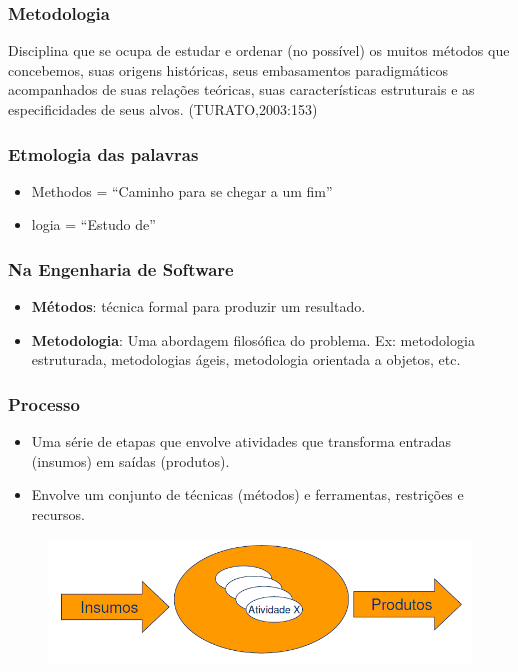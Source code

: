 \begin{frame}
 \frametitle{Metodologia}
 \begin{center}
  \begin{block}{}
   Disciplina que se ocupa de estudar e ordenar (no possível) os muitos métodos que
concebemos, suas origens históricas, seus embasamentos paradigmáticos
acompanhados de suas relações teóricas, suas características estruturais e as
especificidades de seus alvos. (TURATO,2003:153)
  \end{block}
 \end{center}
\end{frame}

\begin{frame}
 \frametitle{Etmologia das palavras}
 \begin{itemize}
  \item Methodos = “Caminho para se chegar a um fim”
  \item logia = “Estudo de”
 \end{itemize}
\end{frame}

\begin{frame}
 \frametitle{Na Engenharia de Software}
 \begin{itemize}
  \item \textbf{Métodos}: técnica formal para produzir um
resultado.
\item \textbf{Metodologia}: Uma abordagem filosófica do
problema. Ex: metodologia estruturada, metodologias ágeis, metodologia orientada a
objetos, etc.
 \end{itemize}
\end{frame}

\begin{frame}
 \frametitle{Processo}
 \begin{itemize}
  \item Uma série de etapas que envolve atividades que transforma entradas (insumos) em
saídas (produtos).
\item Envolve um conjunto de técnicas (métodos) e ferramentas, restrições e recursos.
 \end{itemize}
\begin{figure}
 \centering
 \includegraphics[height = 0.4\textheight]{figs/fig4.png}
\end{figure}
 \end{frame}

